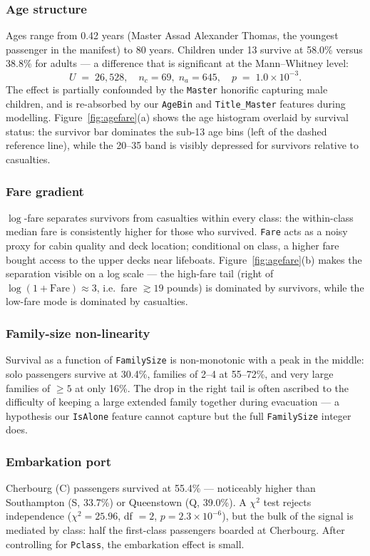 \documentclass[10pt,a4paper,twocolumn]{article}
\begin{document}
\subsubsection{Age structure}
Ages range from 0.42 years (Master Assad Alexander Thomas, the youngest passenger in
the manifest) to 80 years. Children under 13 survive at 58.0\% versus 38.8\% for
adults --- a difference that is significant at the Mann--Whitney level:
\[
U \;=\; 26{,}528,\quad n_c = 69,\; n_a = 645,\quad p \;=\; 1.0\times 10^{-3}.
\]
The effect is partially confounded by the \texttt{Master} honorific capturing male
children, and is re-absorbed by our \texttt{AgeBin} and \texttt{Title\_Master}
features during modelling. Figure~\ref{fig:agefare}(a) shows the age histogram
overlaid by survival status: the survivor bar dominates the sub-13 age bins (left of
the dashed reference line), while the 20--35 band is visibly depressed for survivors
relative to casualties.

\subsubsection{Fare gradient}
$\log$-fare separates survivors from casualties within every class: the within-class
median fare is consistently higher for those who survived. \texttt{Fare} acts as a
noisy proxy for cabin quality and deck location; conditional on class, a higher fare
bought access to the upper decks near lifeboats.
Figure~\ref{fig:agefare}(b) makes the separation visible on a log scale --- the
high-fare tail (right of $\log(1+\text{Fare})\approx 3$, i.e.\ fare $\gtrsim 19$
pounds) is dominated by survivors, while the low-fare mode is dominated by
casualties.

\subsubsection{Family-size non-linearity}
Survival as a function of \texttt{FamilySize} is non-monotonic with a peak in the
middle: solo passengers survive at 30.4\%, families of 2--4 at 55--72\%, and very
large families of $\ge 5$ at only 16\%. The drop in the right tail is often ascribed
to the difficulty of keeping a large extended family together during evacuation ---
a hypothesis our \texttt{IsAlone} feature cannot capture but the full
\texttt{FamilySize} integer does.

\subsubsection{Embarkation port}
Cherbourg (C) passengers survived at 55.4\% --- noticeably higher than Southampton
(S, 33.7\%) or Queenstown (Q, 39.0\%). A $\chi^2$ test rejects independence
($\chi^2 = 25.96$, df $=2$, $p = 2.3\times 10^{-6}$), but the bulk of the signal
is mediated by class: half the first-class passengers boarded at Cherbourg. After
controlling for \texttt{Pclass}, the embarkation effect is small.
\end{document}
